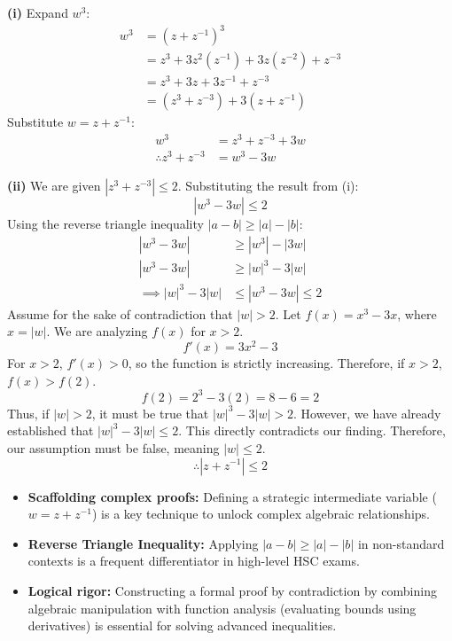 \begin{solution}
\textbf{(i)} Expand $w^3$:
\begin{align*}
w^3 &= (z + z^{-1})^3 \\
&= z^3 + 3z^2(z^{-1}) + 3z(z^{-2}) + z^{-3} \\
&= z^3 + 3z + 3z^{-1} + z^{-3} \\
&= (z^3 + z^{-3}) + 3(z + z^{-1})
\end{align*}
Substitute $w = z + z^{-1}$:
\begin{align*}
w^3 &= z^3 + z^{-3} + 3w \\
\therefore z^3 + z^{-3} &= w^3 - 3w
\end{align*}

\textbf{(ii)} We are given $|z^3 + z^{-3}| \leq 2$.
Substituting the result from (i):
\[ |w^3 - 3w| \leq 2 \]
Using the reverse triangle inequality $|a - b| \ge |a| - |b|$:
\begin{align*}
|w^3 - 3w| &\ge |w^3| - |3w| \\
|w^3 - 3w| &\ge |w|^3 - 3|w| \\
\implies |w|^3 - 3|w| &\leq |w^3 - 3w| \leq 2
\end{align*}
Assume for the sake of contradiction that $|w| > 2$.
Let $f(x) = x^3 - 3x$, where $x = |w|$. We are analyzing $f(x)$ for $x > 2$.
\[ f'(x) = 3x^2 - 3 \]
For $x > 2$, $f'(x) > 0$, so the function is strictly increasing.
Therefore, if $x > 2$, $f(x) > f(2)$.
\[ f(2) = 2^3 - 3(2) = 8 - 6 = 2 \]
Thus, if $|w| > 2$, it must be true that $|w|^3 - 3|w| > 2$.
However, we have already established that $|w|^3 - 3|w| \leq 2$.
This directly contradicts our finding.
Therefore, our assumption must be false, meaning $|w| \leq 2$.
\[ \therefore |z + z^{-1}| \leq 2 \]
\end{solution}

\begin{takeaways}
\begin{itemize}[leftmargin=*]
    \item \textbf{Scaffolding complex proofs:} Defining a strategic intermediate variable ($w = z + z^{-1}$) is a key technique to unlock complex algebraic relationships.
    \item \textbf{Reverse Triangle Inequality:} Applying $|a - b| \ge |a| - |b|$ in non-standard contexts is a frequent differentiator in high-level HSC exams.
    \item \textbf{Logical rigor:} Constructing a formal proof by contradiction by combining algebraic manipulation with function analysis (evaluating bounds using derivatives) is essential for solving advanced inequalities.
\end{itemize}
\end{takeaways}
